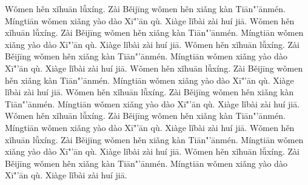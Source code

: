\documentclass[12pt,a5paper]{article}
\begin{document}


Wǒmen hěn xǐhuān lǚxíng.  Zài Běijīng wǒmen hěn xiǎng kàn Tiān"'ānmén.
Míngtiān wǒmen xiǎng yào dào Xī"'ān qù.  Xiàge lǐbài zài huí jiā.
Wǒmen hěn xǐhuān lǚxíng.  Zài Běijīng wǒmen hěn xiǎng kàn Tiān"'ānmén.
Míngtiān wǒmen xiǎng yào dào Xī"'ān qù.  Xiàge lǐbài zài huí jiā.
Wǒmen hěn xǐhuān lǚxíng.  Zài Běijīng wǒmen hěn xiǎng kàn Tiān"'ānmén.
Míngtiān wǒmen xiǎng yào dào Xī"'ān qù.  Xiàge lǐbài zài huí jiā.
Wǒmen hěn xǐhuān lǚxíng.  Zài Běijīng wǒmen hěn xiǎng kàn Tiān"'ānmén.
Míngtiān wǒmen xiǎng yào dào Xī"'ān qù.  Xiàge lǐbài zài huí jiā.
Wǒmen hěn xǐhuān lǚxíng.  Zài Běijīng wǒmen hěn xiǎng kàn Tiān"'ānmén.
Míngtiān wǒmen xiǎng yào dào Xī"'ān qù.  Xiàge lǐbài zài huí jiā.
Wǒmen hěn xǐhuān lǚxíng.  Zài Běijīng wǒmen hěn xiǎng kàn Tiān"'ānmén.
Míngtiān wǒmen xiǎng yào dào Xī"'ān qù.  Xiàge lǐbài zài huí jiā.
Wǒmen hěn xǐhuān lǚxíng.  Zài Běijīng wǒmen hěn xiǎng kàn Tiān"'ānmén.
Míngtiān wǒmen xiǎng yào dào Xī"'ān qù.  Xiàge lǐbài zài huí jiā.
Wǒmen hěn xǐhuān lǚxíng.  Zài Běijīng wǒmen hěn xiǎng kàn Tiān"'ānmén.
Míngtiān wǒmen xiǎng yào dào Xī"'ān qù.  Xiàge lǐbài zài huí jiā.
\end{document}
